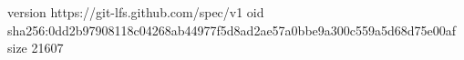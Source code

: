 version https://git-lfs.github.com/spec/v1
oid sha256:0dd2b97908118c04268ab44977f5d8ad2ae57a0bbe9a300c559a5d68d75e00af
size 21607
